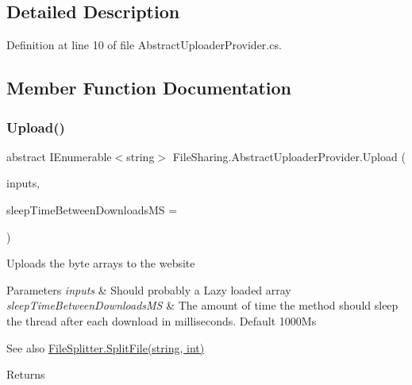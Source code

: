 \subsection{Detailed Description}


Definition at line 10 of file Abstract\+Uploader\+Provider.\+cs.



\subsection{Member Function Documentation}
\mbox{\label{class_file_sharing_1_1_abstract_uploader_provider_a951930bd16d0cfd061fa2dfd055e2601}} 
\subsubsection{\texorpdfstring{Upload()}{Upload()}\hspace{0.1cm}{\footnotesize\ttfamily [1/2]}}
{\footnotesize\ttfamily abstract I\+Enumerable$<$string$>$ File\+Sharing.\+Abstract\+Uploader\+Provider.\+Upload (\begin{DoxyParamCaption}\item[{I\+Enumerable$<$ byte\mbox{[}$\,$\mbox{]}$>$}]{inputs,  }\item[{int}]{sleep\+Time\+Between\+Downloads\+MS = {} }\end{DoxyParamCaption})\hspace{0.3cm}{\ttfamily [pure virtual]}}



Uploads the byte arrays to the website 


\begin{DoxyParams}{Parameters}
{\em inputs} & Should probably a Lazy loaded array\\
\hline
{\em sleep\+Time\+Between\+Downloads\+MS} & The amount of time the method should sleep the thread after each download in milliseconds. Default 1000\+Ms\\
\hline
\end{DoxyParams}
\begin{DoxySeeAlso}{See also}
\hyperlink{class_file_sharing_1_1_file_splitter_a25696a2fad3740fa24f79fd194da6ec3}{File\+Splitter.\+Split\+File(string, int)}


\end{DoxySeeAlso}
\begin{DoxyReturn}{Returns}

\end{DoxyReturn}


